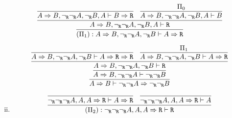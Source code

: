 \begin{enumerate}[(i)]
            $$
                \infer{
                                (\Pi_1) : A\Rightarrow B, \ngr\ngr A,\ngr B \vdash A\Rightarrow \R
                            }{
                                \infer{
                                    A\Rightarrow B, \ngr\ngr A,\ngr B, A\vdash \R
                                }{
                                    \infer{
                                        A\Rightarrow B, \ngr\ngr A,\ngr B, A\vdash B \Rightarrow \R
                                    }{
                                    }&
                                    \infer{
                                        A\Rightarrow B, \ngr\ngr A,\ngr B, A\vdash B
                                    }{
                                        \Pi_0
                                    }
                                }
                            }
            $$
            
            \bigskip
            
            $$
                \infer{
                    A\Rightarrow B \vdash \ngr\ngr A \Rightarrow \ngr \ngr B
                }{
                    \infer{
                        A\Rightarrow B, \ngr\ngr A \vdash \ngr \ngr B
                    }{
                        \infer{
                            A\Rightarrow B, \ngr\ngr A,\ngr B \vdash \R 
                        }{
                            \infer{
                                A\Rightarrow B, \ngr\ngr A,\ngr B \vdash A\Rightarrow \R \Rightarrow \R 
                            }{
                            }&
                            \infer{
                                A\Rightarrow B, \ngr\ngr A,\ngr B \vdash A\Rightarrow \R
                            }{
                                \Pi_1
                            }
                        }
                    }
                }
            $$
        \item
            $$
                            \infer{
                                (\Pi_2) : \ngr \ngr \ngr A, A, A\Rightarrow\R \vdash \R
                            }{
                                \infer{
                                    \ngr \ngr \ngr A, A, A\Rightarrow\R \vdash A\Rightarrow\R
                                }{
                                }&
                                \infer{
                                    \ngr \ngr \ngr A, A, A\Rightarrow\R \vdash A
                                }{
                                }
                            }
            $$        
        

\end{enumerate}
